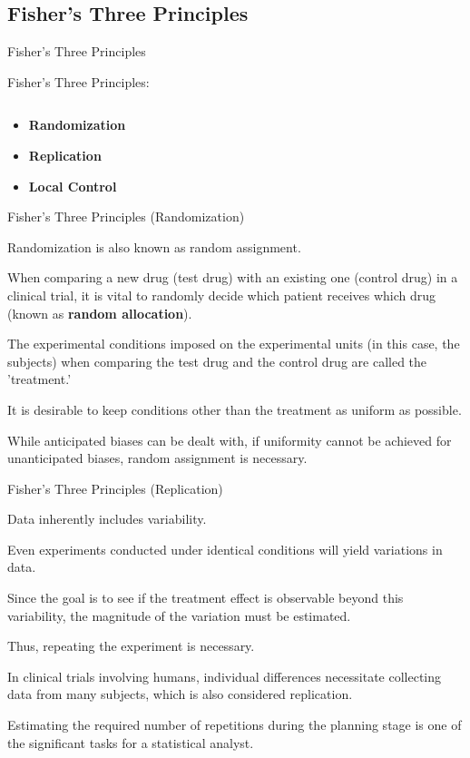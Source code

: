 \documentclass[dvipdfmx, autodetect-engine, aspectratio=169, 10.5pt]{beamer}
\begin{document}
\subsection{Fisher's Three Principles}

\begin{frame}{Fisher's Three Principles}

	Fisher's Three Principles:

	${}$

	\begin{itemize}
		\item \textbf{Randomization}
		\item \textbf{Replication}
		\item \textbf{Local Control}
	\end{itemize}

\end{frame}

\begin{frame}{Fisher's Three Principles (Randomization)}

	Randomization is also known as random assignment.

	When comparing a new drug (test drug) with an existing one (control drug) in a clinical trial, it is vital to randomly decide which patient receives which drug (known as \textbf{random allocation}).

	The experimental conditions imposed on the experimental units (in this case, the subjects) when comparing the test drug and the control drug are called the 'treatment.'

	It is desirable to keep conditions other than the treatment as uniform as possible.

	While anticipated biases can be dealt with, if uniformity cannot be achieved for unanticipated biases, random assignment is necessary.

\end{frame}

\begin{frame}{Fisher's Three Principles (Replication)}

	Data inherently includes variability.

	Even experiments conducted under identical conditions will yield variations in data.

	Since the goal is to see if the treatment effect is observable beyond this variability, the magnitude of the variation must be estimated.

	Thus, repeating the experiment is necessary.

	In clinical trials involving humans, individual differences necessitate collecting data from many subjects, which is also considered replication.

	Estimating the required number of repetitions during the planning stage is one of the significant tasks for a statistical analyst.

\end{frame}
\end{document}
